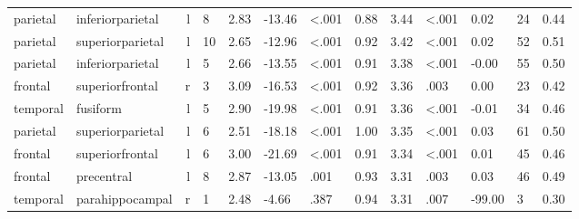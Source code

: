 \documentclass{article}
\begin{document}
\begin{longtable}{llrR{1.3cm}R{1cm}R{1.3cm}R{1cm}R{1cm}R{1.3cm}R{1cm}R{1.8cm}R{1.3cm}R{1.8cm}}
  parietal &          inferiorparietal &    l &         8 &                  2.83 &           -13.46 &      \textless.001 &                               0.88 &                          3.44 &                   \textless.001 &   0.02 &     24 &      0.44 \\
  parietal &          superiorparietal &    l &        10 &                  2.65 &           -12.96 &      \textless.001 &                               0.92 &                          3.42 &                   \textless.001 &   0.02 &     52 &      0.51 \\
  parietal &          inferiorparietal &    l &         5 &                  2.66 &           -13.55 &      \textless.001 &                               0.91 &                          3.38 &                   \textless.001 &  -0.00 &     55 &      0.50 \\
   frontal &           superiorfrontal &    r &         3 &                  3.09 &           -16.53 &      \textless.001 &                               0.92 &                          3.36 &                            .003 &   0.00 &     23 &      0.42 \\
  temporal &                  fusiform &    l &         5 &                  2.90 &           -19.98 &      \textless.001 &                               0.91 &                          3.36 &                   \textless.001 &  -0.01 &     34 &      0.46 \\
  parietal &          superiorparietal &    l &         6 &                  2.51 &           -18.18 &      \textless.001 &                               1.00 &                          3.35 &                   \textless.001 &   0.03 &     61 &      0.50 \\
   frontal &           superiorfrontal &    l &         6 &                  3.00 &           -21.69 &      \textless.001 &                               0.91 &                          3.34 &                   \textless.001 &   0.01 &     45 &      0.46 \\
   frontal &                precentral &    l &         8 &                  2.87 &           -13.05 &               .001 &                               0.93 &                          3.31 &                            .003 &   0.03 &     46 &      0.49 \\
  temporal &           parahippocampal &    r &         1 &                  2.48 &            -4.66 &               .387 &                               0.94 &                          3.31 &                            .007 & -99.00 &      3 &      0.30 \\

\end{longtable}
\end{document}
